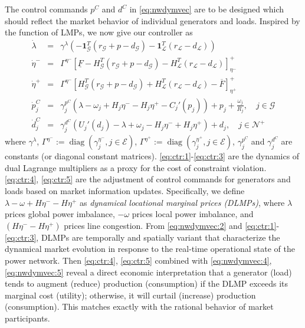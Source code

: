 \documentclass[journal,12pt,onecolumn,draftclsnofoot]{IEEEtran}
\newcommand{\diag}{\mathop{\mathrm{diag}}}
\begin{document}
The control commands $p^C$ and $d^C$ in \eqref{eq:nwdymvec} are to be designed which should reflect the market behavior of individual generators and loads. Inspired by the function of LMPs, we now give our controller as 
\begin{subequations}
	\begin{eqnarray}
	\label{eq:ctr:1}
	\dot \lambda & = & \gamma^\lambda \left( - \mathbf 1^T_\mathcal{G} (r_\mathcal{G}+p-d_\mathcal{G})  - \mathbf 1^T_\mathcal{L} (r_\mathcal{L}-d_\mathcal{L}) \right) \\
	\label{eq:ctr:2}
	\dot \eta^- & = & \Gamma^{\eta^-} \left[\underline{F} - H^T_{\mathcal{G}}(r_\mathcal{G}+p-d_\mathcal{G}) - H^T_\mathcal{L}(r_\mathcal{L}-d_\mathcal{L})  \right]^+_{\eta^-}   \\
	\label{eq:ctr:3}
	\dot \eta^+ & = & \Gamma^{\eta^-} \left[ H^T_{\mathcal{G}}(r_\mathcal{G}+p-d_\mathcal{G}) + H^T_\mathcal{L}(r_\mathcal{L}-d_\mathcal{L}) - \overline{F}  \right]^+_{\eta^+}   \\	
	\label{eq:ctr:4}
	\dot p_j^C  & =&	\gamma_j^{p^C} \left(  \lambda -  \omega_j   +  H_j \eta^- - H_j \eta^+ - C_j'(p_j)   \right) + p_j+\frac{\omega_j }{R_j}  ,\quad j\in\mathcal{G}  \\
	\label{eq:ctr:5}
	\dot d_j^C & = & \gamma_j^{d^C} \left(U_j'(d_j)  -  \lambda +  \omega_j - H_j \eta^- +  H_j\eta^+    \right) + d_j, \quad  j\in\mathcal{N}^+
	\end{eqnarray}\label{eq:ctr}%
\end{subequations}
where $\gamma^\lambda$, $ \Gamma^{\eta^{-}}:=\diag(\gamma_j^{\eta^-}, j\in\mathcal{E})$, $ \Gamma^{\eta^{+}}:=\diag(\gamma_j^{\eta^+}, j\in\mathcal{E})$, $\gamma_j^{p^C}$ and $\gamma_j^{d^C}$ are constants (or diagonal constant matrices). \eqref{eq:ctr:1}-\eqref{eq:ctr:3} are the dynamics of dual Lagrange multipliers as a proxy for the cost of constraint violation. \eqref{eq:ctr:4}, \eqref{eq:ctr:5} are the adjustment of control commands for generators and loads based on market information updates. Specifically, we define $\lambda - \omega +H \eta^- - H\eta^+$ as \emph{dynamical locational marginal prices (DLMPs)}, where $\lambda$ prices global power imbalance, $-\omega$ prices local power imbalance, and $(H \eta^- - H\eta^+)$ prices line congestion. From \eqref{eq:nwdymvec:2} and \eqref{eq:ctr:1}-\eqref{eq:ctr:3}, DLMPs are temporally and spatially variant that characterize the dynamical market evolution in response to the real-time operational state of the power network. Then \eqref{eq:ctr:4}, \eqref{eq:ctr:5} combined with \eqref{eq:nwdymvec:4}, \eqref{eq:nwdymvec:5} reveal a direct economic interpretation that a generator (load) tends to augment (reduce) production (consumption) if the DLMP exceeds its marginal cost (utility); otherwise, it will curtail (increase) production (consumption). This matches exactly with the rational behavior of market participants.  
\end{document}

